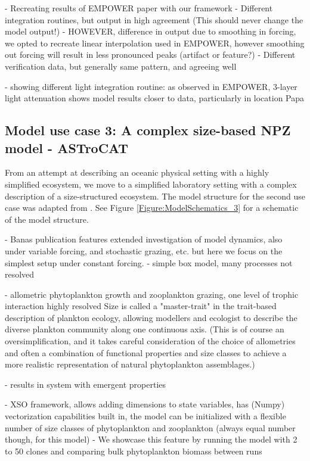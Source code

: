 \documentclass[journal abbreviation, manuscript]{copernicus}
\begin{document}
- Recreating results of EMPOWER paper with our framework
- Different integration routines, but output in high agreement (This should never change the model output!)
- HOWEVER, difference in output due to smoothing in forcing, we opted to recreate linear interpolation used in EMPOWER, however smoothing out forcing will result in less pronounced peaks (artifact or feature?)
- Different verification data, but generally same pattern, and agreeing well 

- showing different light integration routine: as observed in EMPOWER, 3-layer light attenuation shows model results closer to data, particularly in location Papa



\subsection{Model use case 3: A complex size-based NPZ model - ASTroCAT}

From an attempt at describing an oceanic physical setting with a highly simplified ecosystem, we move to a simplified laboratory setting with a complex description of a size-structured ecosystem. The model structure for the second use case was adapted from \cite{Banas2011b}. See Figure \ref{Figure:ModelSchematics_3} for a schematic of the model structure. 

- Banas publication features extended investigation of model dynamics, also under variable forcing, and stochastic grazing, etc. but here we focus on the simplest setup under constant forcing.
- simple box model, many processes not resolved

- allometric phytoplankton growth and zooplankton grazing, one level of trophic interaction highly resolved
Size is called a "master-trait" in the trait-based description of plankton ecology, allowing modellers and ecologist to describe the diverse plankton community along one continuous axis. (This is of course an oversimplification, and it takes careful consideration of the choice of allometries and often a combination of functional properties and size classes to achieve a more realistic representation of natural phytoplankton assemblages.)

- results in system with emergent properties

- XSO framework, allows adding dimensions to state variables, has (Numpy) vectorization capabilities built in, the model can be initialized with a flexible number of size classes of phytoplankton and zooplankton (always equal number though, for this model)
- We showcase this feature by running the model with 2 to 50 clones and comparing bulk phytoplankton biomass between runs
\end{document}
